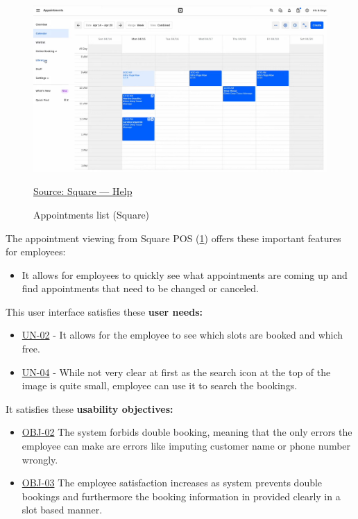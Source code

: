 \documentclass[]{VUMIFTemplateClass}
\begin{document}
\begin{figure}[H]
    \centering
    \includegraphics[width=\textwidth]{images/examples/appointments_square.png}
    \caption{Appointments list (Square)}
    \href{https://squareup.com/help/us/en}{Source: Square — Help}
    \label{fig:appointment-list}
\end{figure}

The appointment viewing from Square POS (\ref{fig:appointment-list}) offers these important features for employees:

\begin{itemize}
    \item It allows for employees to quickly see what appointments are coming up and find appointments that need to be changed or canceled.
\end{itemize}

This user interface satisfies these \textbf{user needs:}

\begin{itemize}
    \item \hyperref[UN-02]{UN-02} - It allows for the employee to see which slots are booked and which free.
    \item \hyperref[UN-04]{UN-04} - While not very clear at first as the search icon at the top of the image is quite small, employee can use it to search the bookings.
\end{itemize}

It satisfies these \textbf{usability objectives:}

\begin{itemize}
    \item \hyperref[OBJ-02]{OBJ-02} The system forbids double booking, meaning that the only errors the employee can make are errors like imputing customer name or phone number wrongly.
    \item \hyperref[OBJ-03]{OBJ-03} The employee satisfaction increases as system prevents double bookings and furthermore the booking information in provided clearly in a slot based manner.
\end{itemize}
\end{document}
